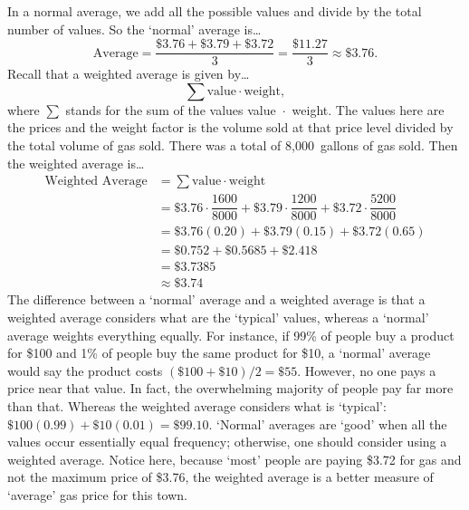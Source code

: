 \documentclass[11pt,letterpaper]{article}
\begin{document}
\sol In a normal average, we add all the possible values and divide by the total number of values. So the `normal' average is\dots 
	\[
	\text{Average}= \dfrac{\$3.76 + \$3.79 + \$3.72}{3}= \dfrac{\$11.27}{3} \approx \$3.76.
	\]
Recall that a weighted average is given by\dots 
	\[
	\sum \text{value} \cdot \text{weight},
	\] 
where $\sum$ stands for the sum of the values value~$\cdot$~weight. The values here are the prices and the weight factor is the volume sold at that price level divided by the total volume of gas sold. There was a total of 8,000~gallons of gas sold. Then the weighted average is\dots
	\[
	\begin{aligned}
	\text{Weighted Average}&= \sum \text{value} \cdot \text{weight} \\[0.3cm]
	&= \$3.76 \cdot \dfrac{1600}{8000} + \$3.79 \cdot \dfrac{1200}{8000} + \$3.72 \cdot \dfrac{5200}{8000} \\[0.3cm]
	&= \$3.76 (0.20) + \$3.79 (0.15) + \$3.72 (0.65) \\[0.3cm]
	&= \$0.752 + \$0.5685 + \$2.418 \\[0.3cm]
	&= \$3.7385 \\[0.3cm]
	&\approx \$3.74
	\end{aligned}
	\]
The difference between a `normal' average and a weighted average is that a weighted average considers what are the `typical' values, whereas a `normal' average weights everything equally. For instance, if 99\% of people buy a product for \$100 and 1\% of people buy the same product for \$10, a `normal' average would say the product costs $(\$100 + \$10)/2= \$55$. However, no one pays a price near that value. In fact, the overwhelming majority of people pay far more than that. Whereas the weighted average considers what is `typical': $\$100(0.99) + \$10(0.01)= \$99.10$. `Normal' averages are `good' when all the values occur essentially equal frequency; otherwise, one should consider using a weighted average. Notice here, because `most' people are paying \$3.72 for gas and not the maximum price of \$3.76, the weighted average is a better measure of `average' gas price for this town. 
\end{document}
